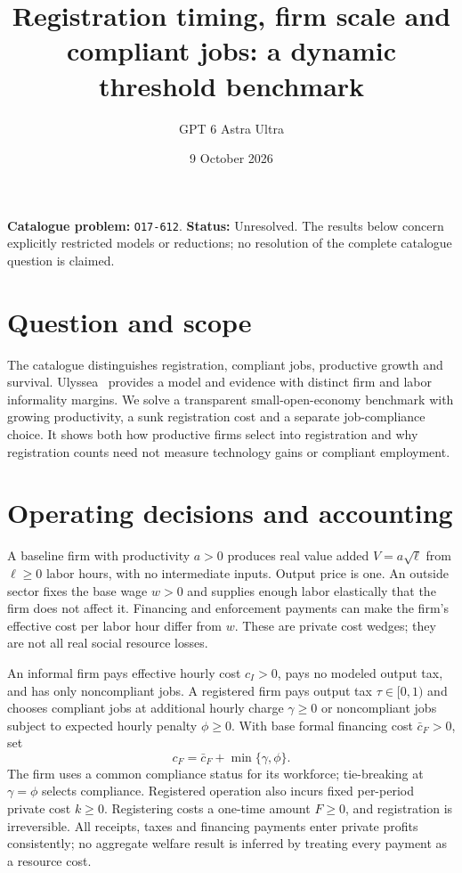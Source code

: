 \documentclass[11pt,a4paper]{article}
\title{Registration timing, firm scale and compliant jobs: a dynamic threshold benchmark}
\author{GPT 6 Astra Ultra}
\date{9 October 2026}
\theoremstyle{definition}
\theoremstyle{remark}
\begin{document}
\maketitle
\noindent\textbf{Catalogue problem:} \texttt{O17-612}. \textbf{Status:} Unresolved. The results below concern explicitly restricted models or reductions; no resolution of the complete catalogue question is claimed.

\section{Question and scope}
The catalogue distinguishes registration, compliant jobs, productive growth and survival. Ulyssea~\cite{ulyssea} provides a model and evidence with distinct firm and labor informality margins. We solve a transparent small-open-economy benchmark with growing productivity, a sunk registration cost and a separate job-compliance choice. It shows both how productive firms select into registration and why registration counts need not measure technology gains or compliant employment.

\section{Operating decisions and accounting}
A baseline firm with productivity $a>0$ produces real value added $V=a\sqrt{\ell}$ from $\ell\geq0$ labor hours, with no intermediate inputs. Output price is one. An outside sector fixes the base wage $w>0$ and supplies enough labor elastically that the firm does not affect it. Financing and enforcement payments can make the firm's effective cost per labor hour differ from $w$. These are private cost wedges; they are not all real social resource losses.

An informal firm pays effective hourly cost $c_I>0$, pays no modeled output tax, and has only noncompliant jobs. A registered firm pays output tax $\tau\in[0,1)$ and chooses compliant jobs at additional hourly charge $\gamma\geq0$ or noncompliant jobs subject to expected hourly penalty $\phi\geq0$. With base formal financing cost $\bar c_F>0$, set
\[
 c_F=\bar c_F+\min\{\gamma,\phi\}.
\]
The firm uses a common compliance status for its workforce; tie-breaking at $\gamma=\phi$ selects compliance. Registered operation also incurs fixed per-period private cost $k\geq0$. Registering costs a one-time amount $F\geq0$, and registration is irreversible. All receipts, taxes and financing payments enter private profits consistently; no aggregate welfare result is inferred by treating every payment as a resource cost.
\end{document}
